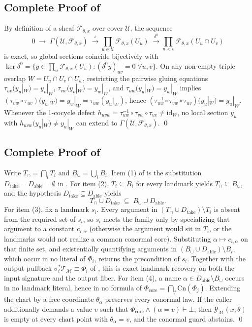 \documentclass[11pt]{article}
\theoremstyle{definition}
\theoremstyle{plain}
\newcommand{\Ycal}{\mathcal{Y}}
\newcommand{\Ucal}{\mathcal{U}}
\newcommand{\Fcal}{\mathcal{F}}
\newcommand{\Mcal}{\mathcal{M}}
\newcommand{\Tcal}{\mathcal{T}}
\newcommand{\Phicore}{\Phi_{\mathrm{core}}}
\begin{document}
\subsection{Complete Proof of \texorpdfstring{}{Theorem 3}}
By definition of a sheaf $\Fcal_{\theta,x}$ over cover $\Ucal$, the sequence
\[
  0 \;\longrightarrow\; \Gamma(\Ucal, \Fcal_{\theta,x}) \;\xrightarrow{\;\iota\;} \prod_{u \in \Ucal} \Fcal_{\theta,x}(U_u) \;\xrightarrow{\;\delta^0\;} \prod_{u < v} \Fcal_{\theta,x}(U_u \cap U_v)
\]
is exact, so global sections coincide bijectively with $\ker \delta^0 = \{y \in \prod_u \Fcal_{\theta,x}(U_u) : (\delta^0 y)_{uv} = 0\;\forall u,v\}$. On any non-empty triple overlap $W = U_u \cap U_v \cap U_w$, restricting the pairwise gluing equations $\tau_{uv}(y_u|_W) = y_v|_W$, $\tau_{vw}(y_v|_W) = y_w|_W$, and $\tau_{uw}(y_u|_W) = y_w|_W$ implies $(\tau_{vw} \circ \tau_{uv})(y_u|_W) = y_w|_W = \tau_{uw}(y_u|_W)$, hence $(\tau_{uw}^{-1} \circ \tau_{vw} \circ \tau_{uv})(y_u|_W) = y_u|_W$. Whenever the 1-cocycle defect $h_{uvw} = \tau_{uw}^{-1} \circ \tau_{vw} \circ \tau_{uv} \neq \mathrm{id}_W$, no local section $y_u$ with $h_{uvw}(y_u|_W) \neq y_u|_W$ can extend to $\Gamma(\Ucal, \Fcal_{\theta,x})$. \qed

\subsection{Complete Proof of \texorpdfstring{}{Corollary 1}}
Write $T_{\cap} = \bigcap_i T_i$ and $B_{\cup} = \bigcup_i B_i$. Item (1) of  is the substitution $D_{\mathrm{take}} = D_{\mathrm{able}} = \emptyset$ in . For item (2), $T_i \subseteq B_i$ for every landmark yields $T_{\cap} \subseteq B_{\cup}$, and the hypothesis $D_{\mathrm{take}} \subseteq D_{\mathrm{able}}$ yields
\[
  T_{\cap} \cup D_{\mathrm{take}} \;\subseteq\; B_{\cup} \cup D_{\mathrm{able}}.
\]
For item (3), fix a landmark $s_i$. Every argument in $(T_{\cap} \cup D_{\mathrm{take}}) \setminus T_i$ is absent from the required set of $s_i$, so $s_i$ meets the family only by specializing that argument to a constant $c_{i,\alpha}$ (otherwise the argument would sit in $T_i$, or the landmarks would not realize a common conormal core). Substituting $\alpha \mapsto c_{i,\alpha}$ on that finite set, and existentially quantifying arguments in $(B_{\cup} \cup D_{\mathrm{able}}) \setminus B_i$, which occur in no literal of $\Phi_i$, returns the precondition of $s_i$. Together with the output pullback $\sigma_i^* \Tcal_{\Mcal} \equiv \Phi_i$ of , this is exact landmark recovery on both the input signature and the output fiber. For item (4), a name $\alpha \in D_{\mathrm{able}} \setminus B_{\cup}$ occurs in no landmark literal, hence in no formula of $\Phicore = \bigcap_j \mathrm{Cn}(\Phi_j)$. Extending the chart by a free coordinate $\theta_\alpha$ preserves every conormal law. If the caller additionally demands a value $v$ such that $\Phicore \land (\alpha = v) \vdash \bot$, then $\Ycal_{\Mcal}(x; \theta)$ is empty at every chart point with $\theta_\alpha = v$, and the conormal guard abstains. \qed
\end{document}
